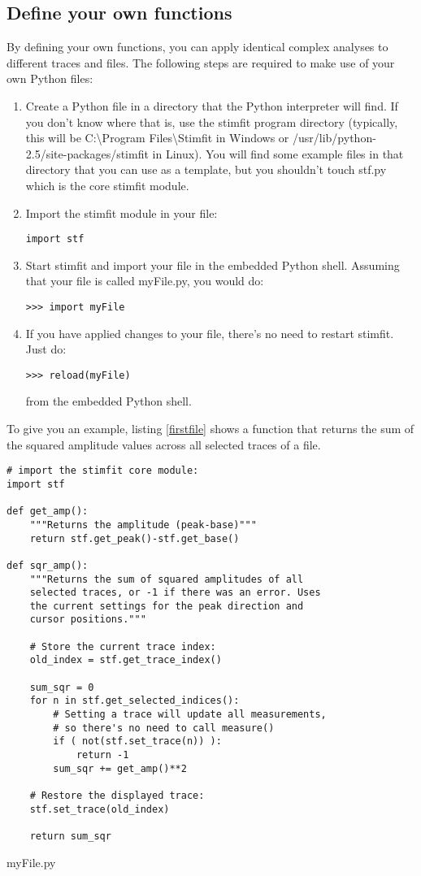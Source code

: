 \subsection{Define your own functions}
By defining your own functions, you can apply identical complex analyses to different traces and files. The following steps are required to make use of your own Python files:
\begin{enumerate}
 \item Create a Python file in a directory that the Python interpreter will find. If you don't know where that is, use the stimfit program directory (typically, this will be C:{\textbackslash}Program Files{\textbackslash}Stimfit in Windows or /usr/lib/python-2.5/site-packages/\linebreak[0]stimfit in Linux). You will find some example files in that directory that you can use as a template, but you shouldn't touch stf.py which is the core stimfit module.
 \item Import the stimfit module in your file:
\begin{lstlisting}
import stf
\end{lstlisting}
\item Start stimfit and import your file in the embedded Python shell. Assuming that your file is called myFile.py, you would do:
\begin{lstlisting}
>>> import myFile
\end{lstlisting}
\item If you have applied changes to your file, there's no need to restart stimfit. Just do:
\begin{lstlisting}
>>> reload(myFile)
\end{lstlisting}
from the embedded Python shell.
\end{enumerate}
To give you an example, listing \ref{firstfile} shows a function that returns the sum of the squared amplitude values across all selected traces of a file.
\begin{listing}
\lstset{numbers=left}
\begin{lstlisting}
# import the stimfit core module:
import stf

def get_amp():
    """Returns the amplitude (peak-base)"""
    return stf.get_peak()-stf.get_base()

def sqr_amp():
    """Returns the sum of squared amplitudes of all 
    selected traces, or -1 if there was an error. Uses 
    the current settings for the peak direction and 
    cursor positions."""

    # Store the current trace index:
    old_index = stf.get_trace_index()

    sum_sqr = 0
    for n in stf.get_selected_indices():
        # Setting a trace will update all measurements,
        # so there's no need to call measure()
        if ( not(stf.set_trace(n)) ):
            return -1
        sum_sqr += get_amp()**2

    # Restore the displayed trace:
    stf.set_trace(old_index)

    return sum_sqr
\end{lstlisting}
\lstset{numbers=none}
  \caption {
    myFile.py
  }
  \label{firstfile}
\end{listing}

